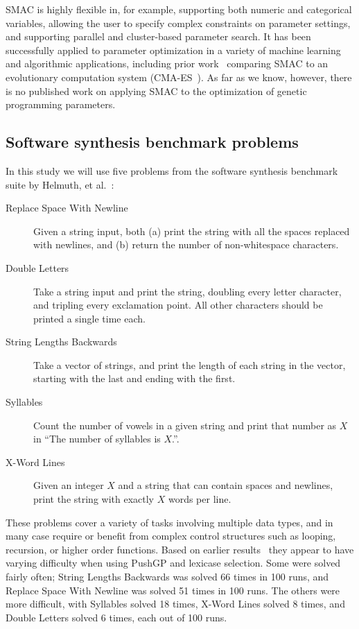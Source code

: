 SMAC is highly flexible in, for example, supporting both numeric and
categorical variables, allowing the user to specify complex constraints
on parameter settings, and supporting parallel and cluster-based
parameter search. It has been successfully applied to parameter
optimization in a variety of machine learning and algorithmic 
applications, including prior 
work~\cite{hutter2013evaluation} comparing SMAC to an
evolutionary computation system (CMA-ES~\cite{hansen1996adapting}).
As far as we know, however, there is no published work on applying SMAC to
the optimization of genetic programming parameters.

\subsection{Software synthesis benchmark problems}
\label{sec:benchmarkProblems}

In this study we will use five problems from the software synthesis 
benchmark suite by Helmuth, et al.~\cite{Helmuth:2015:GECCO}:
\begin{description}
	\item[Replace Space With Newline] Given a string input, both (a) print
	the string with all the spaces replaced with newlines, and (b) return 
	the number of non-whitespace characters.
	\item[Double Letters] Take a string input and print the string, doubling
	every letter character, and tripling every exclamation point. All other
	characters should be printed a single time each.
	\item[String Lengths Backwards] Take a vector of strings, and print the length
	of each string in the vector, starting with the last and ending with the
	first.
	\item[Syllables] Count the number of vowels in a given string and print
	that number as $X$ in ``The number of syllables is $X$.''.
	\item[X-Word Lines] Given an integer $X$ and a string that can contain
	spaces and newlines, print the string with exactly $X$ words per line.
\end{description}
These problems cover a variety of tasks involving multiple data types, and
in many case require or benefit from complex control structures such as
looping, recursion, or higher order functions. Based on earlier 
results~\cite{Helmuth:2015:GECCO} they appear to have varying difficulty
when using PushGP and lexicase selection. Some were solved fairly often; String
Lengths Backwards was solved 66 times in 100 runs, and Replace Space With Newline was solved 51 times in 100 runs. The others were more difficult, with
Syllables solved 18 times, X-Word Lines solved 8  times, and Double Letters
solved 6 times, each out of 100 runs.

